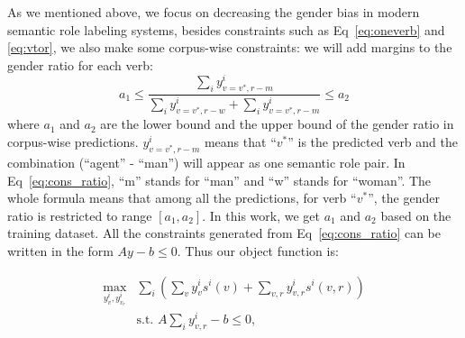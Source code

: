 As we mentioned above, we focus on decreasing the gender bias in modern semantic role labeling systems, besides constraints such as Eq~\eqref{eq:oneverb} and \eqref{eq:vtor}, we also make some corpus-wise constraints: we will add  margins to the gender ratio for each verb:
\begin{equation}\label{eq:cons_ratio}
 a_1 \leq \frac{\sum_i y^i_{v = v^*, r - m}}{\sum_i y^i_{v = v^*, r - w} + \sum_i y^i_{v = v^*, r - m}} \leq a_2
\end{equation}
where $a_1$ and $a_2$ are the lower bound and the upper bound of the gender ratio in corpus-wise predictions. $y^i_{v = v^*, r- m}$ means that ``$v^*$'' is the predicted verb and the combination (``agent'' - ``man'') will appear as one  semantic role pair. In Eq~\eqref{eq:cons_ratio}, ``m'' stands for ``man'' and ``w'' stands for ``woman''. The whole formula means that among all the predictions, for verb ``$v^*$'', the gender ratio is restricted to range $[a_1, a_2]$. In this work, we get $a_1$ and $a_2$ based on the training dataset. All the constraints generated from Eq~\eqref{eq:cons_ratio}  can be written in the form $Ay - b \leq 0$. Thus our object function is:

\begin{subequations}
\label{eq:objforlr}
\begin{align}
    \max_{y^i_v, y^i_{v_r}} & {\sum_i (\sum_v  y^i_v s^i(v)+\sum_{v,r}y^i_{v,r}s^i(v,r))} 
    \label{eq:objforlr1} \\        
& \text{s.t. } 
    A\sum_i y_{v,r}^i - b \leq 0, \label{eq:objforlr2}       
\end{align}
\end{subequations}